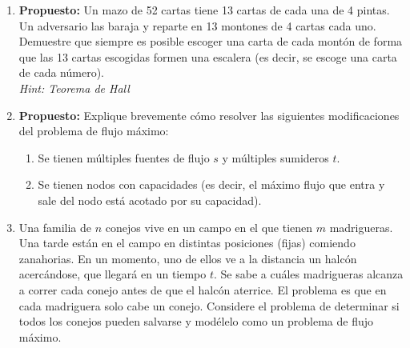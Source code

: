 \begin{enumerate}[label ={\bf P\arabic*}]
    \item \textbf{Propuesto:} Un mazo de 52 cartas tiene 13 cartas de cada una de 4 pintas. Un adversario las baraja y reparte en 13 montones de 4 cartas cada uno. Demuestre que siempre es posible escoger una carta de cada montón de forma que las 13 cartas escogidas formen una escalera (es decir, se escoge una carta de cada número).
    \\ \textit{Hint: Teorema de Hall}

	\item \textbf{Propuesto:} Explique brevemente cómo resolver las siguientes modificaciones del problema de flujo máximo:\begin{enumerate}
        \item Se tienen múltiples fuentes de flujo $s$ y múltiples sumideros $t$.
        \item Se tienen nodos con capacidades (es decir, el máximo flujo que entra y sale del nodo está acotado por su capacidad).
    \end{enumerate}

    \item Una familia de $n$ conejos vive en un campo en el que tienen $m$ madrigueras. Una tarde están en el campo en distintas posiciones (fijas) comiendo zanahorias. En un momento, uno de ellos ve a la distancia un halcón acercándose, que llegará en un tiempo $t$. Se sabe a cuáles madrigueras alcanza a correr cada conejo antes de que el halcón aterrice. El problema es que en cada madriguera solo cabe un conejo. Considere el problema de determinar si todos los conejos pueden salvarse y modélelo como un problema de flujo máximo.
    
\end{enumerate}
